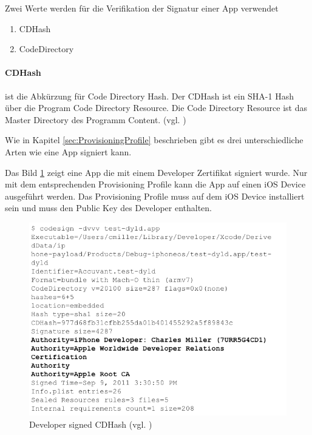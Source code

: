 Zwei Werte werden für die Verifikation der Signatur einer App verwendet
\begin{enumerate}
    \item CDHash
    \item CodeDirectory
\end{enumerate}

\paragraph{CDHash} ist die Abkürzung für Code Directory Hash. Der CDHash ist ein SHA-1 Hash über die \glqq Program Code Directory Resource\grqq. Die Code Directory Resource ist das Master Directory des Programm Content. (vgl. \cite{CDHash[1], Debug[1], Debug[2]}) \par

Wie in Kapitel \ref{sec:ProvisioningProfile} beschrieben gibt es drei unterschiedliche Arten wie eine App signiert kann.

Das Bild \ref{fig:Developer signed CDHash} zeigt eine App die mit einem Developer Zertifikat signiert wurde. Nur mit dem entsprechenden Provisioning Profile kann die App auf einen iOS Device ausgeführt werden. Das Provisioning Profile muss auf dem iOS Device installiert sein und muss den Public Key des Developer enthalten.\par 
\begin{figure}[!ht]
        \centering
        \includegraphics[scale=0.6]{developerZert-codesign-CDHash.png}
        \caption{Developer signed CDHash (vgl. \cite{Hacking[1]})}
        \label{fig:Developer signed CDHash}
\end{figure}

